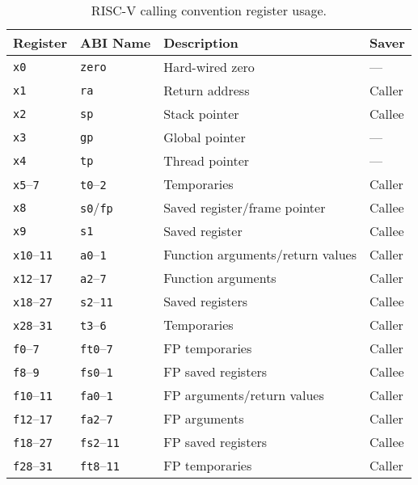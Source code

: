 \vspace{0.2in}
\begin{table*}[htbp]
\begin{center}
\begin{tabular}{|l|l|l|l|}

  \hline
  Register            & ABI Name            & Description        & Saver \\ \hline 
  \tt x0              & \tt zero            & Hard-wired zero    & --- \\
  \tt x1              & \tt ra              & Return address     & Caller \\
  \tt x2              & \tt sp              & Stack pointer      & Callee \\
  \tt x3              & \tt gp              & Global pointer     & --- \\
  \tt x4              & \tt tp              & Thread pointer     & --- \\
  {\tt x5}--{\tt 7}   & {\tt t0}--{\tt 2}   & Temporaries        & Caller \\
  \tt x8              & {\tt s0}/\tt fp     & Saved register/frame pointer & Callee \\
  \tt x9              & {\tt s1}            & Saved register     & Callee \\
  {\tt x10}--{\tt 11} & {\tt a0}--{\tt 1}   & Function arguments/return values & Caller \\
  {\tt x12}--{\tt 17} & {\tt a2}--{\tt 7}   & Function arguments & Caller \\
  {\tt x18}--{\tt 27} & {\tt s2}--{\tt 11}  & Saved registers    & Callee \\
  {\tt x28}--{\tt 31} & {\tt t3}--{\tt 6}   & Temporaries        & Caller \\
  \hline
  {\tt f0}--{\tt 7}   & {\tt ft0}--{\tt 7}  & FP temporaries     & Caller \\
  {\tt f8}--{\tt 9}   & {\tt fs0}--{\tt 1}  & FP saved registers & Callee \\
  {\tt f10}--{\tt 11} & {\tt fa0}--{\tt 1}  & FP arguments/return values & Caller \\
  {\tt f12}--{\tt 17} & {\tt fa2}--{\tt 7}  & FP arguments       & Caller \\
  {\tt f18}--{\tt 27} & {\tt fs2}--{\tt 11} & FP saved registers & Callee \\
  {\tt f28}--{\tt 31} & {\tt ft8}--{\tt 11} & FP temporaries     & Caller \\
  \hline

 \end{tabular}
\end{center}
\caption{RISC-V calling convention register usage.}
\label{regmap}
\end{table*}

